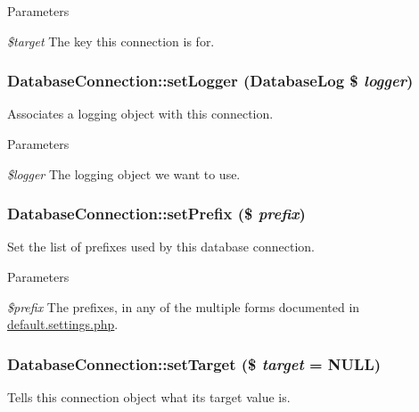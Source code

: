 \begin{DoxyParams}{Parameters}
\item[{\em \$target}]The key this connection is for. \end{DoxyParams}
\hypertarget{classDatabaseConnection_aaa0bb7258ae1b10cf8e762bd63c15ac2}{
\subsubsection[{setLogger}]{\setlength{\rightskip}{0pt plus 5cm}DatabaseConnection::setLogger ({\bf DatabaseLog} \$ {\em logger})}}
\label{classDatabaseConnection_aaa0bb7258ae1b10cf8e762bd63c15ac2}
Associates a logging object with this connection.


\begin{DoxyParams}{Parameters}
\item[{\em \$logger}]The logging object we want to use. \end{DoxyParams}
\hypertarget{classDatabaseConnection_a8df68d814aa91a31f57990575d8349b6}{
\subsubsection[{setPrefix}]{\setlength{\rightskip}{0pt plus 5cm}DatabaseConnection::setPrefix (\$ {\em prefix})}}
\label{classDatabaseConnection_a8df68d814aa91a31f57990575d8349b6}
Set the list of prefixes used by this database connection.


\begin{DoxyParams}{Parameters}
\item[{\em \$prefix}]The prefixes, in any of the multiple forms documented in \hyperlink{default_8settings_8php}{default.settings.php}. \end{DoxyParams}
\hypertarget{classDatabaseConnection_ac4f67f4031517e8c1ee6acfa40427159}{
\subsubsection[{setTarget}]{\setlength{\rightskip}{0pt plus 5cm}DatabaseConnection::setTarget (\$ {\em target} = {\ttfamily NULL})}}
\label{classDatabaseConnection_ac4f67f4031517e8c1ee6acfa40427159}
Tells this connection object what its target value is.

